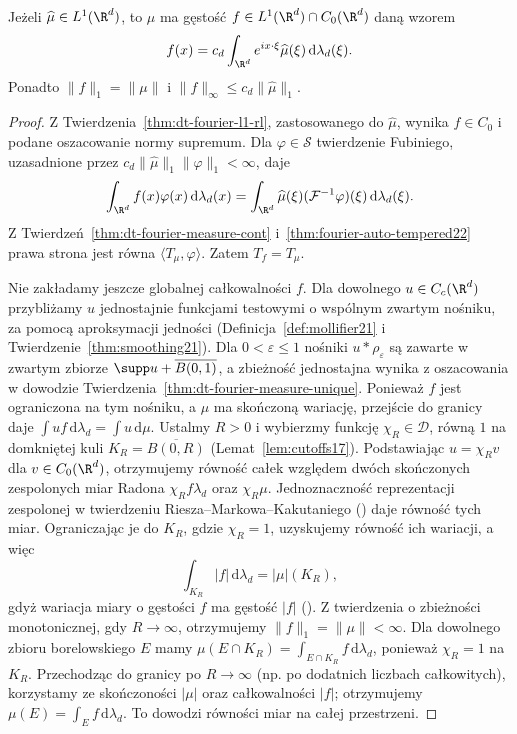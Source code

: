\begin{twierdzenie}
\label{thm:dt-fourier-measure-inversion}
Jeżeli $\widehat\mu\in L^1(\R^d)$, to $\mu$ ma
gęstość $f\in L^1(\R^d)\cap C_0(\R^d)$ daną wzorem
\[
 f(x)=c_d\int_{\R^d}e^{ix\cdot\xi}\widehat\mu(\xi)
 \,\mathrm d\lambda_d(\xi).
\]
Ponadto $\|f\|_1=\|\mu\|$ i
$\|f\|_\infty\le c_d\|\widehat\mu\|_1$.
\end{twierdzenie}
\begin{proof}
Z Twierdzenia~\ref{thm:dt-fourier-l1-rl}, zastosowanego
do $\widehat\mu$, wynika $f\in C_0$ i podane
oszacowanie normy supremum.
Dla $\varphi\in\mathcal S$ twierdzenie Fubiniego,
uzasadnione przez $c_d\|\widehat\mu\|_1\|\varphi\|_1<\infty$,
daje
\[
 \int_{\R^d} f(x)\varphi(x)\,\mathrm d\lambda_d(x)
 =\int_{\R^d}\widehat\mu(\xi)
             (\mathcal F^{-1}\varphi)(\xi)\,\mathrm d\lambda_d(\xi).
\]
Z Twierdzeń~\ref{thm:dt-fourier-measure-cont}
i~\ref{thm:fourier-auto-tempered22} prawa strona
jest równa $\langle T_\mu,\varphi\rangle$.
Zatem $T_f=T_\mu$.

Nie zakładamy jeszcze globalnej całkowalności $f$.
Dla dowolnego $u\in C_c(\R^d)$ przybliżamy $u$
jednostajnie funkcjami testowymi o wspólnym zwartym
nośniku, za pomocą aproksymacji jedności
(Definicja~\ref{def:mollifier21} i
Twierdzenie~\ref{thm:smoothing21}).
Dla $0<\varepsilon\le1$ nośniki $u*\rho_\varepsilon$
są zawarte w zwartym zbiorze
$\supp u+\overline{B(0,1)}$, a zbieżność jednostajna
wynika z oszacowania w dowodzie
Twierdzenia~\ref{thm:dt-fourier-measure-unique}.
Ponieważ $f$ jest ograniczona na tym nośniku, a $\mu$
ma skończoną wariację, przejście do granicy daje
$\int u f\,\mathrm d\lambda_d=\int u\,\mathrm d\mu$.
Ustalmy $R>0$ i wybierzmy funkcję
$\chi_R\in\mathcal D$, równą $1$ na domkniętej
kuli $K_R=\overline{B(0,R)}$ (Lemat~\ref{lem:cutoffs17}).
Podstawiając $u=\chi_R v$ dla $v\in C_0(\R^d)$,
otrzymujemy równość całek względem dwóch skończonych
zespolonych miar Radona $\chi_R f\lambda_d$ oraz
$\chi_R\mu$. Jednoznaczność reprezentacji zespolonej
w twierdzeniu Riesza--Markowa--Kakutaniego
()
daje równość tych miar. Ograniczając je do $K_R$,
gdzie $\chi_R=1$, uzyskujemy równość ich wariacji,
a więc
\[
 \int_{K_R}|f|\,\mathrm d\lambda_d=|\mu|(K_R),
\]
gdyż wariacja miary o gęstości $f$ ma gęstość $|f|$
().
Z twierdzenia o zbieżności monotonicznej, gdy $R\to\infty$,
otrzymujemy $\|f\|_1=\|\mu\|<\infty$.
Dla dowolnego zbioru borelowskiego $E$ mamy
$\mu(E\cap K_R)=\int_{E\cap K_R}f\,\mathrm d\lambda_d$,
ponieważ $\chi_R=1$ na $K_R$. Przechodząc do granicy
po $R\to\infty$ (np. po dodatnich liczbach całkowitych),
korzystamy ze skończoności $|\mu|$ oraz całkowalności
$|f|$; otrzymujemy $\mu(E)=\int_E f\,\mathrm d\lambda_d$.
To dowodzi równości miar na całej przestrzeni.
\end{proof}

